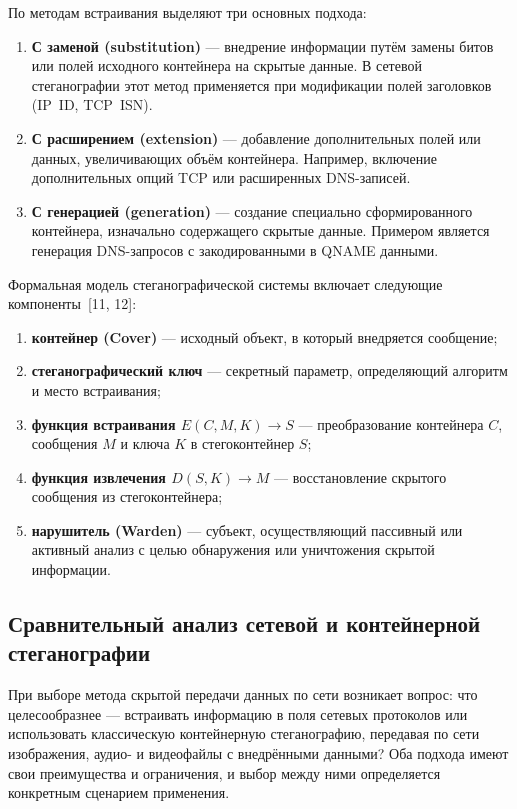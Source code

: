 По методам встраивания выделяют три основных подхода:

\begin{enumerate}[label=\arabic*)]
  \item \textbf{С заменой (substitution)} --- внедрение информации путём замены битов или полей исходного контейнера на скрытые данные. В сетевой стеганографии этот метод применяется при модификации полей заголовков (IP~ID, TCP~ISN).
  \item \textbf{С расширением (extension)} --- добавление дополнительных полей или данных, увеличивающих объём контейнера. Например, включение дополнительных опций TCP или расширенных DNS-записей.
  \item \textbf{С генерацией (generation)} --- создание специально сформированного контейнера, изначально содержащего скрытые данные. Примером является генерация DNS-запросов с закодированными в QNAME данными.
\end{enumerate}

Формальная модель стеганографической системы включает следующие компоненты~[11, 12]:

\begin{enumerate}[label=\arabic*)]
  \item \textbf{контейнер (Cover)} --- исходный объект, в который внедряется сообщение;
  \item \textbf{стеганографический ключ} --- секретный параметр, определяющий алгоритм и место встраивания;
  \item \textbf{функция встраивания $E(C, M, K) \to S$} --- преобразование контейнера $C$, сообщения $M$ и ключа $K$ в стегоконтейнер $S$;
  \item \textbf{функция извлечения $D(S, K) \to M$} --- восстановление скрытого сообщения из стегоконтейнера;
  \item \textbf{нарушитель (Warden)} --- субъект, осуществляющий пассивный или активный анализ с целью обнаружения или уничтожения скрытой информации.
\end{enumerate}

\subsection{Сравнительный анализ сетевой и контейнерной стеганографии}

При выборе метода скрытой передачи данных по сети возникает вопрос: что целесообразнее --- встраивать информацию в поля сетевых протоколов или использовать классическую контейнерную стеганографию, передавая по сети изображения, аудио- и видеофайлы с внедрёнными данными? Оба подхода имеют свои преимущества и ограничения, и выбор между ними определяется конкретным сценарием применения.

